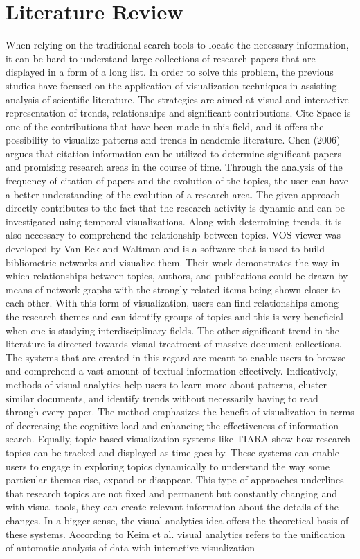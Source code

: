 \documentclass[sigconf]{acmart}
\begin{document}
\section{Literature Review}
When relying on the traditional search tools to locate the necessary information, it can be hard to understand large collections of research papers that are displayed in a form of a long list. In order to solve this problem, the previous studies have focused on the application of visualization techniques in assisting analysis of scientific literature. The strategies are aimed at visual and interactive representation of trends, relationships and significant contributions. Cite Space is one of the contributions that have been made in this field, and it offers the possibility to visualize patterns and trends in academic literature. Chen (2006) \cite{chen2006citespace} argues that citation information can be utilized to determine significant papers and promising research areas in the course of time. Through the analysis of the frequency of citation of papers and the evolution of the topics, the user can have a better understanding of the evolution of a research area. The given approach directly contributes to the fact that the research activity is dynamic and can be investigated using temporal visualizations. Along with determining trends, it is also necessary to comprehend the relationship between topics. VOS viewer was developed by Van Eck and Waltman \cite{vaneck2010vosviewer} and is a software that is used to build bibliometric networks and visualize them. Their work demonstrates the way in which relationships between topics, authors, and publications could be drawn by means of network graphs with the strongly related items being shown closer to each other. With this form of visualization, users can find relationships among the research themes and can identify groups of topics and this is very beneficial when one is studying interdisciplinary fields. The other significant trend in the literature is directed towards visual treatment of massive document collections. The systems that are created in this regard are meant to enable users to browse and comprehend a vast amount of textual information effectively. Indicatively, methods of visual analytics help users to learn more about patterns, cluster similar documents, and identify trends without necessarily having to read through every paper. The method emphasizes the benefit of visualization in terms of decreasing the cognitive load and enhancing the effectiveness of information search. Equally, topic-based visualization systems like TIARA show how research topics can be tracked and displayed as time goes by. These systems can enable users to engage in exploring topics dynamically to understand the way some particular themes rise, expand or disappear. This type of approaches underlines that research topics are not fixed and permanent but constantly changing and with visual tools, they can create relevant information about the details of the changes. In a bigger sense, the visual analytics idea offers the theoretical basis of these systems. According to Keim et al. \cite{keim2010visualanalytics} visual analytics refers to the unification of automatic analysis of data with interactive visualization 
\end{document}
